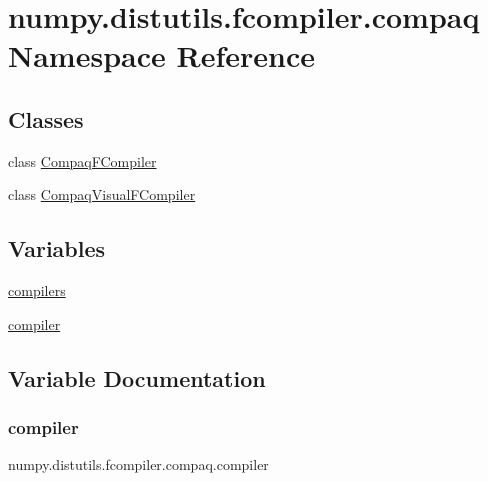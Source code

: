 \hypertarget{namespacenumpy_1_1distutils_1_1fcompiler_1_1compaq}{}\section{numpy.\+distutils.\+fcompiler.\+compaq Namespace Reference}
\label{namespacenumpy_1_1distutils_1_1fcompiler_1_1compaq}
\subsection*{Classes}
\begin{DoxyCompactItemize}
\item 
class \hyperlink{classnumpy_1_1distutils_1_1fcompiler_1_1compaq_1_1CompaqFCompiler}{Compaq\+F\+Compiler}
\item 
class \hyperlink{classnumpy_1_1distutils_1_1fcompiler_1_1compaq_1_1CompaqVisualFCompiler}{Compaq\+Visual\+F\+Compiler}
\end{DoxyCompactItemize}
\subsection*{Variables}
\begin{DoxyCompactItemize}
\item 
\hyperlink{namespacenumpy_1_1distutils_1_1fcompiler_1_1compaq_a3f84fa88b7cbb817eb9481a5a76b0aa2}{compilers}
\item 
\hyperlink{namespacenumpy_1_1distutils_1_1fcompiler_1_1compaq_ac08b0af8265ab494ee05ee0737e07443}{compiler}
\end{DoxyCompactItemize}


\subsection{Variable Documentation}
\mbox{\label{namespacenumpy_1_1distutils_1_1fcompiler_1_1compaq_ac08b0af8265ab494ee05ee0737e07443}} 
\subsubsection{\texorpdfstring{compiler}{compiler}}
{\footnotesize\ttfamily numpy.\+distutils.\+fcompiler.\+compaq.\+compiler}

